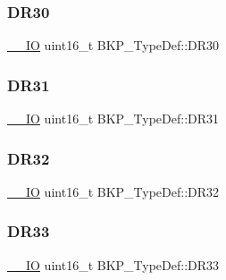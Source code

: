 \mbox{\label{struct_b_k_p___type_def_a7413138b9d21280f51975d9f80c66826}} 
\subsubsection{\texorpdfstring{DR30}{DR30}}
{\footnotesize\ttfamily \mbox{\hyperlink{group___c_m_s_i_s___c_m3__core__definitions_gaec43007d9998a0a0e01faede4133d6be}{\+\_\+\+\_\+\+IO}} uint16\+\_\+t B\+K\+P\+\_\+\+Type\+Def\+::\+D\+R30}

\mbox{\label{struct_b_k_p___type_def_a59e675eaee3b1035123bc6d21a19e153}} 
\subsubsection{\texorpdfstring{DR31}{DR31}}
{\footnotesize\ttfamily \mbox{\hyperlink{group___c_m_s_i_s___c_m3__core__definitions_gaec43007d9998a0a0e01faede4133d6be}{\+\_\+\+\_\+\+IO}} uint16\+\_\+t B\+K\+P\+\_\+\+Type\+Def\+::\+D\+R31}

\mbox{\label{struct_b_k_p___type_def_af55d82fdc7570503f812dc3ba895ed61}} 
\subsubsection{\texorpdfstring{DR32}{DR32}}
{\footnotesize\ttfamily \mbox{\hyperlink{group___c_m_s_i_s___c_m3__core__definitions_gaec43007d9998a0a0e01faede4133d6be}{\+\_\+\+\_\+\+IO}} uint16\+\_\+t B\+K\+P\+\_\+\+Type\+Def\+::\+D\+R32}

\mbox{\label{struct_b_k_p___type_def_a8f15e1d81071ebe109d6558acd8f3d9a}} 
\subsubsection{\texorpdfstring{DR33}{DR33}}
{\footnotesize\ttfamily \mbox{\hyperlink{group___c_m_s_i_s___c_m3__core__definitions_gaec43007d9998a0a0e01faede4133d6be}{\+\_\+\+\_\+\+IO}} uint16\+\_\+t B\+K\+P\+\_\+\+Type\+Def\+::\+D\+R33}

